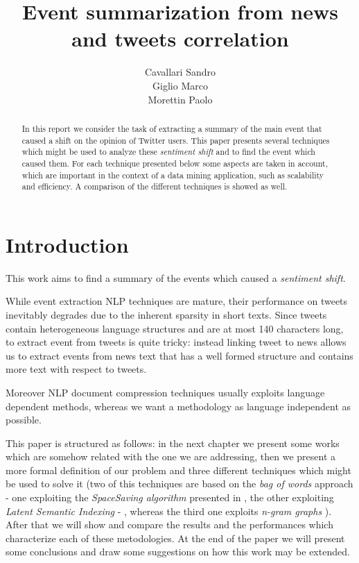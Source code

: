 \documentclass{acm_proc_article-sp-sigmod07}
\begin{document}
\title{Event summarization from news and tweets correlation}
\author{Cavallari Sandro\\Giglio Marco\\Morettin Paolo}

%
\maketitle
\begin{abstract}
In this report we consider the task of extracting a summary of the main event
that caused a shift on the opinion of Twitter users. This paper presents
several techniques which might be used to analyze these \emph{sentiment shift}
and to find the event which caused them. For each technique presented below
some aspects are taken in account, which are important in the context of a data
mining application, such as scalability and efficiency. A comparison of the
different techniques is showed as well.\end{abstract}   

\section*{Introduction}
This work aims to find a summary of the events which caused a \emph{sentiment shift}. 

While event extraction NLP techniques are mature, their performance on tweets inevitably degrades due to the inherent sparsity in short texts.  Since tweets contain heterogeneous language structures and are at most 140 characters long, to extract event from tweets is quite tricky: instead linking tweet to news allows us to extract events from news text that has a well formed structure and contains more text with respect to tweets.


Moreover NLP document compression techniques usually exploits language
dependent methods, whereas we want a methodology as language independent as
possible. 

This paper is structured as follows: in the next chapter we present some works
which are somehow related with the one we are addressing, then we present a more
formal definition of our problem and three different techniques which might be
used to solve it (two of this techniques are based on the \emph{bag of words}
approach - one exploiting the \emph{SpaceSaving algorithm} presented in
\cite{SS}, the other exploiting \emph{Latent Semantic Indexing} \cite{LSA} - ,
whereas the third one exploits \emph{n-gram graphs} \cite{Ngram}).
After that we will show and compare the results and the performances which
characterize each of these metodologies. At the end of the paper we will present
some conclusions and draw some suggestions on how this work may be extended.
\end{document}
